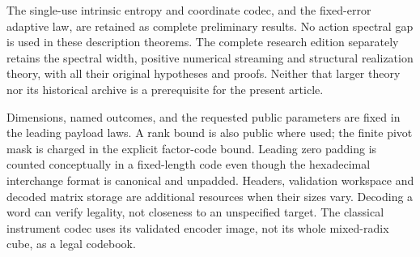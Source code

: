 The single-use intrinsic entropy and coordinate codec, and the
fixed-error adaptive law, are retained as complete preliminary
results. No action spectral gap is used in these description theorems.
The complete research edition separately retains the spectral width,
positive numerical streaming and structural realization theory, with
all their original hypotheses and proofs. Neither that larger theory
nor its historical archive is a prerequisite for the present article.

Dimensions, named outcomes, and the requested public parameters are
fixed in the leading payload laws. A rank bound is also public where
used; the finite pivot mask is charged in the explicit factor-code
bound. Leading zero padding is counted conceptually in a fixed-length
code even though the hexadecimal interchange format is canonical and
unpadded. Headers, validation workspace and decoded matrix storage
are additional resources when their sizes vary. Decoding a word can
verify legality, not closeness to an unspecified target. The classical
instrument codec uses its validated encoder image, not its whole
mixed-radix cube, as a legal codebook.
